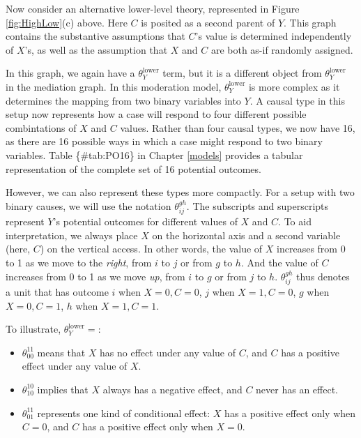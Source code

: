 \documentclass[12pt,]{book}
\providecommand{\tightlist}{%
  \setlength{\itemsep}{0pt}\setlength{\parskip}{0pt}}
\begin{document}
Now consider an alternative lower-level theory, represented in Figure \ref{fig:HighLow}(c) above. Here \(C\) is posited as a second parent of \(Y\). This graph contains the substantive assumptions that \(C\)'s value is determined independently of \(X\)'s, as well as the assumption that \(X\) and \(C\) are both as-if randomly assigned.

In this graph, we again have a \(\theta_Y^{\text{lower}}\) term, but it is a different object from \(\theta_Y^{\text{lower}}\) in the mediation graph. In this moderation model, \(\theta_Y^{\text{lower}}\) is more complex as it determines the mapping from two binary variables into \(Y\). A causal type in this setup now represents how a case will respond to four different possible combintations of \(X\) and \(C\) values. Rather than four causal types, we now have 16, as there are 16 possible ways in which a case might respond to two binary variables. Table \{\#tab:PO16\} in Chapter \ref{models} provides a tabular representation of the complete set of 16 potential outcomes.

However, we can also represent these types more compactly. For a setup with two binary causes, we will use the notation \(\theta_{ij}^{gh}\). The subscripts and superscripts represent \(Y\)'s potential outcomes for different values of \(X\) and \(C\). To aid interpretation, we always place \(X\) on the horizontal axis and a second variable (here, \(C\)) on the vertical access. In other words, the value of \(X\) increases from 0 to 1 as we move to the \emph{right}, from \(i\) to \(j\) or from \(g\) to \(h\). And the value of \(C\) increases from 0 to 1 as we move \emph{up}, from \(i\) to \(g\) or from \(j\) to \(h\). \(\theta_{ij}^{gh}\) thus denotes a unit that has outcome \(i\) when \(X=0, C=0\), \(j\) when \(X=1, C=0\), \(g\) when \(X=0, C=1\), \(h\) when \(X=1, C=1\).

To illustrate, \(\theta_Y^{\text{lower}}=\):

\begin{itemize}
\tightlist
\item
  \(\theta_{00}^{11}\) means that \(X\) has no effect under any value of \(C\), and \(C\) has a positive effect under any value of \(X\).
\item
  \(\theta_{10}^{10}\) implies that \(X\) always has a negative effect, and \(C\) never has an effect.
\item
  \(\theta_{01}^{11}\) represents one kind of conditional effect: \(X\) has a positive effect only when \(C=0\), and \(C\) has a positive effect only when \(X=0\).
\end{itemize}
\end{document}
